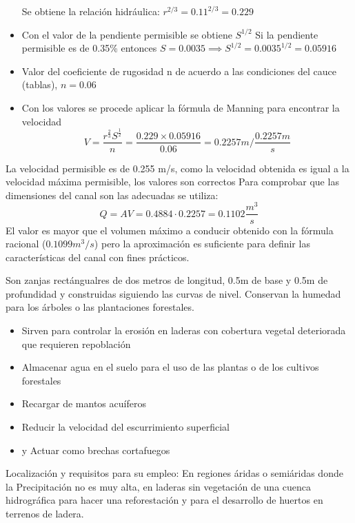 \begin{example}
\begin{itemize}
        Se obtiene la relación hidráulica: $r^{2/3}=0.11^{2/3}=0.229$
        \item Con el valor de la pendiente permisible se obtiene $S^{1/2}$
        Si la pendiente permisible es de 0.35\% entonces $S=0.0035\implies S^{1/2}=0.0035^{1/2}=0.05916$
        \item Valor del coeficiente de rugosidad n de acuerdo a las condiciones del cauce (tablas), $n=0.06$
        \item Con los valores se procede aplicar la fórmula de Manning para encontrar la velocidad
        \begin{equation}
            V = \frac{r^{\frac{2}{3}}S^{\frac{1}{2}}}{n} = \frac{0.229\times 0.05916}{0.06} = 0.2257m/\frac{0.2257m}{s}
        \end{equation}
    \end{itemize}
    La velocidad permisible es de 0.255 m/s, como la velocidad obtenida es igual a la velocidad máxima permisible, los valores son correctos Para comprobar que las dimensiones del canal son las adecuadas se utiliza:
    \begin{equation*}
        Q= AV = 0.4884 \cdot 0.2257 = 0.1102 \frac{m^3}{s}
    \end{equation*}
    El valor es mayor que el volumen máximo a conducir obtenido con la fórmula racional ($0.1099m^3/s$) pero la aproximación es suficiente para definir las características del canal con fines prácticos.
    \end{example}
    Son zanjas rectángualres de dos metros de longitud, 0.5m de base y 0.5m de profundidad y construidas siguiendo las curvas de nivel. Conservan la humedad para los árboles o las plantaciones forestales.
    \begin{itemize}
        \item Sirven para controlar la erosión en laderas con cobertura vegetal deteriorada que requieren repoblación
        \item Almacenar agua en el suelo para el uso de las plantas o de los cultivos forestales
        \item Recargar de mantos acuíferos 
        \item Reducir la velocidad del escurrimiento superficial 
        \item y Actuar como brechas cortafuegos
    \end{itemize}
    Localización y requisitos para su empleo: En regiones áridas o semiáridas donde la Precipitación no es muy alta, en laderas sin vegetación de una cuenca hidrográfica para hacer una reforestación y para el desarrollo de huertos en terrenos de ladera.

